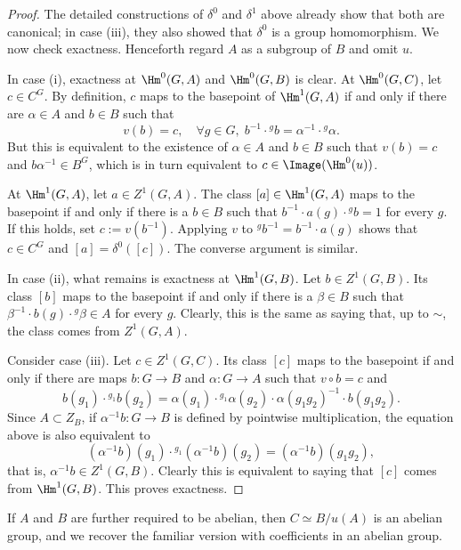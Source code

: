 \begin{proof}
	The detailed constructions of $\delta^0$ and $\delta^1$ above already
	show that both are canonical; in case (iii), they also showed that
	$\delta^0$ is a group homomorphism. We now check exactness. Henceforth
	regard $A$ as a subgroup of $B$ and omit $u$.

	In case (i), exactness at $\Hm^0(G,A)$ and $\Hm^0(G,B)$ is clear. At
	$\Hm^0(G,C)$, let $c\in C^G$. By definition, $c$ maps to the basepoint
	of $\Hm^1(G,A)$ if and only if there are $\alpha\in A$ and $b\in B$ such
	that
	\[ v(b) = c, \quad \forall g \in G,\; b^{-1} \cdot {}^g b = \alpha^{-1} \cdot {}^g \alpha. \]
	But this is equivalent to the existence of $\alpha\in A$ and $b\in B$
	such that $v(b)=c$ and $b\alpha^{-1}\in B^G$, which is in turn
	equivalent to $c\in\Image(\Hm^0(u))$.

	At $\Hm^1(G,A)$, let $a\in Z^1(G,A)$. The class
	$[a]\in\Hm^1(G,A)$ maps to the basepoint if and only if there is a
	$b\in B$ such that $b^{-1}\cdot a(g)\cdot{}^gb=1$ for every $g$. If this
	holds, set $c:=v(b^{-1})$. Applying $v$ to
	${}^gb^{-1}=b^{-1}\cdot a(g)$ shows that $c\in C^G$ and
	$[a]=\delta^0([c])$. The converse argument is similar.

	In case (ii), what remains is exactness at $\Hm^1(G,B)$. Let
	$b\in Z^1(G,B)$. Its class $[b]$ maps to the basepoint if and only if
	there is a $\beta\in B$ such that
	$\beta^{-1}\cdot b(g)\cdot{}^g\beta\in A$ for every $g$. Clearly, this
	is the same as saying that, up to $\sim$, the class comes from
	$Z^1(G,A)$.

	Consider case (iii). Let $c\in Z^1(G,C)$. Its class $[c]$ maps to the
	basepoint if and only if there are maps $b:G\to B$ and $\alpha:G\to A$
	such that $v\circ b=c$ and
	\[ b(g_1) \cdot {}^{g_1} b(g_2) = \alpha(g_1) \cdot {}^{g_1} \alpha(g_2) \cdot \alpha(g_1 g_2)^{-1} \cdot  b(g_1 g_2). \]
	Since $A\subset Z_B$, if $\alpha^{-1}b:G\to B$ is defined by pointwise
	multiplication, the equation above is also equivalent to
	\[ (\alpha^{-1} b)(g_1) \cdot {}^{g_1} (\alpha^{-1} b)(g_2) = (\alpha^{-1} b)(g_1 g_2), \]
	that is, $\alpha^{-1}b\in Z^1(G,B)$. Clearly this is equivalent to saying
	that $[c]$ comes from $\Hm^1(G,B)$. This proves exactness.
\end{proof}

If $A$ and $B$ are further required to be abelian, then
$C\simeq B/u(A)$ is an abelian group, and we recover the familiar version
with coefficients in an abelian group.

